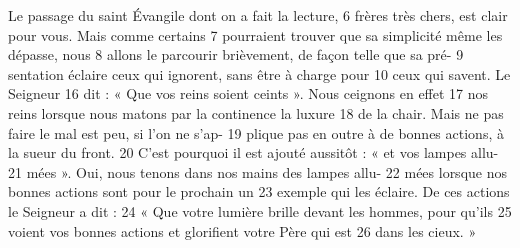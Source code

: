 Le passage du saint Évangile dont on a fait la lecture,	 
6	 	frères très chers, est clair pour vous. Mais comme certains	 
7	 	pourraient trouver que sa simplicité même les dépasse, nous	 
8	 	allons le parcourir brièvement, de façon telle que sa pré-	 
9	 	sentation éclaire ceux qui ignorent, sans être à charge pour	 
10	 	ceux qui savent. Le Seigneur	 
16	 	dit : « Que vos reins soient ceints ». Nous ceignons en effet	 
17	 	nos reins lorsque nous matons par la continence la luxure	 
18	 	de la chair. Mais ne pas faire le mal est peu, si l'on ne s'ap-	 
19	 	plique pas en outre à de bonnes actions, à la sueur du front.	 
20	 	C'est pourquoi il est ajouté aussitôt : « et vos lampes allu-	 
21	 	mées ». Oui, nous tenons dans nos mains des lampes allu-	 
22	 	mées lorsque nos bonnes actions sont pour le prochain un	 
23	 	exemple qui les éclaire. De ces actions le Seigneur a dit :	 
24	 	« Que votre lumière brille devant les hommes, pour qu'ils	 
25	 	voient vos bonnes actions et glorifient votre Père qui est	 
26	 	dans les cieux. »